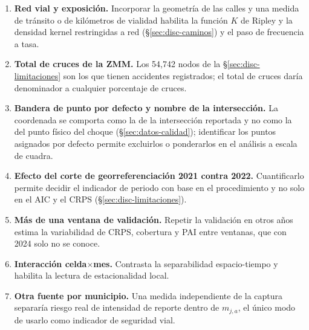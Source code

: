 \begin{enumerate}
	\item \textbf{Red vial y exposición.} Incorporar la geometría de las calles
	      y una medida de tránsito o de kilómetros de vialidad habilita la
	      función $K$ de Ripley y la densidad kernel restringidas a red
	      (§\ref{sec:disc-caminos}) y el paso de frecuencia a tasa.
	\item \textbf{Total de cruces de la ZMM.} Los 54,742 nodos de la
	      §\ref{sec:disc-limitaciones} son los que tienen accidentes
	      registrados; el total de cruces daría denominador a cualquier
	      porcentaje de cruces.
	\item \textbf{Bandera de punto por defecto y nombre de la intersección.}
	      La coordenada se comporta como la de la intersección reportada y no
	      como la del punto físico del choque (§\ref{sec:datos-calidad});
	      identificar los puntos asignados por defecto permite excluirlos o
	      ponderarlos en el análisis a escala de cuadra.
	\item \textbf{Efecto del corte de georreferenciación 2021 contra 2022.}
	      Cuantificarlo permite decidir el indicador de periodo con base en el
	      procedimiento y no solo en el AIC y el CRPS
	      (§\ref{sec:disc-limitaciones}).
	\item \textbf{Más de una ventana de validación.} Repetir la validación en
	      otros años estima la variabilidad de CRPS, cobertura y PAI entre
	      ventanas, que con 2024 solo no se conoce.
	\item \textbf{Interacción celda$\times$mes.} Contrasta la separabilidad
	      espacio-tiempo y habilita la lectura de estacionalidad local.
	\item \textbf{Otra fuente por municipio.} Una medida independiente de la
	      captura separaría riesgo real de intensidad de reporte dentro de
	      $m_{j,a}$, el único modo de usarlo como indicador de seguridad vial.
\end{enumerate}
